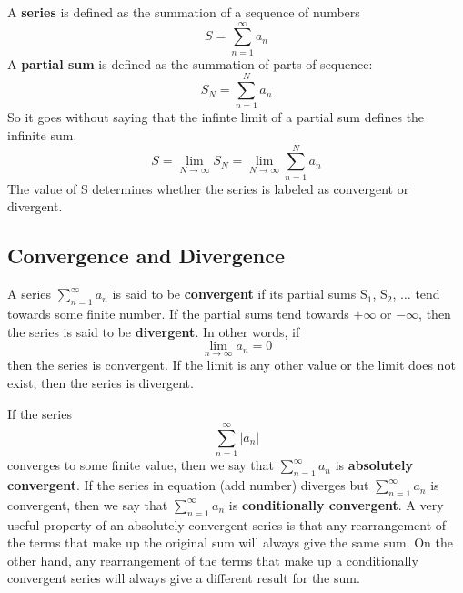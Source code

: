 \documentclass{article}
\newcommand{\be}{\begin{equation}}
\newcommand{\ee}{\end{equation}}
\begin{document}
A \textbf{series} is defined as the summation of a sequence of numbers
\be
S=\sum_{n=1}^{\infty} a_n
\ee
A \textbf{partial sum} is defined as the summation of parts of sequence:
\be
S_N = \sum_{n=1}^{N} a_n
\ee
So it goes without saying that the infinte limit of a partial sum defines the infinite sum.
\be
S = \lim_{N \to \infty}{S_N} = \lim_{N \to \infty} \sum_{n=1}^{N} a_n
\ee
The value of S determines whether the series is labeled as convergent or divergent.
\subsection*{Convergence and Divergence}
A series $\sum\limits_{n=1}^{\infty} a_n$ is said to be \textbf{convergent} if its partial sums S$_1$, S$_2$, $\hdots$ tend towards some finite number.
If the partial sums tend towards $+\infty$ or $-\infty$, then the series is said to be \textbf{divergent}.
In other words, if
\be
\lim_{n \to \infty}{a_n} = 0
\ee
then the series is convergent.
If the limit is any other value or the limit does not exist, then the series is divergent.

If the series
\be
\sum_{n=1}^{\infty} |a_n|
\ee
converges to some finite value, then we say that $\sum\limits_{n=1}^{\infty} a_n$ is \textbf{absolutely convergent}.
If the series in equation (add number) diverges but $\sum\limits_{n=1}^{\infty} a_n$ is convergent, then we say that $\sum\limits_{n=1}^{\infty} a_n$ is \textbf{conditionally convergent}.
A very useful property of an absolutely convergent series is that any rearrangement of the terms that make up the original sum will always give the same sum.
On the other hand, any rearrangement of the terms that make up a conditionally convergent series will always give a different result for the sum.
\end{document}
